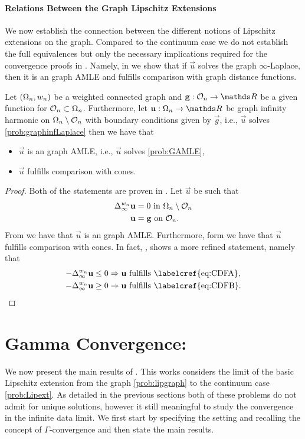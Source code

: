 \paragraph{Relations Between the Graph Lipschitz Extensions} We now establish the connection between the different notions of Lipschitz extensions on the graph. Compared to the continuum case we do not establish the full equivalences but only the necessary implications required for the convergence proofs in \cite{bungert2021uniform}. Namely, in \cite{bungert2021uniform} we show that if $\vec u$ solves the graph $\infty$-Laplace, then it is an graph AMLE and fulfills comparison with graph distance functions. 
%
%
\begin{lemma}{\cite[Th. 3.2, Prop. 3.8]{bungert2021uniform}}{}
Let $(\Omega_n,w_n)$ be a weighted connected graph and $\vec g:\conset_n\to\R$ be a given function for $\mathcal{O}_n\subset\Omega_n$. Furthermore, let $\vec u:\domain_n\to\R$ be graph infinity harmonic on $\Omega_n\setminus\mathcal{O}_n$ with boundary conditions given by $\vec g$, i.e., $\vec u$ solves \cref{prob:graphinfLaplace} then we have that
%
\begin{itemize}
\item $\vec u$ is an graph AMLE, i.e., $\vec u$ solves \cref{prob:GAMLE},
\item $\vec u$ fulfills comparison with cones.
\end{itemize}
\end{lemma}
%
%
\begin{proof}
Both of the statements are proven in \cite{bungert2021uniform}. Let $\vec u$ be such that 
%
\begin{align*}
\Delta^{w_n}_\infty \mathbf{u} &= 0\text{ in }\Omega_n \setminus \mathcal{O}_n\\
\mathbf{u} &= \mathbf{g} \text{ on } \mathcal{O}_n.
\end{align*}
%
From \cite[Prop. 3.8]{bungert2021uniform} we have that $\vec u$ is an graph AMLE. Furthermore, form \cite[Th. 3.2]{bungert2021uniform} we have that $\vec u$ fulfills comparison with cones. In fact, \cite[Th. 3.2]{bungert2021uniform}, shows a more refined statement, namely that
%
\begin{align*}
-\Delta^{w_n}_\infty \vec u &\leq 0 \Rightarrow \vec u \text{ fulfills \labelcref{eq:CDFA}},\\
-\Delta^{w_n}_\infty \vec u &\geq 0 \Rightarrow \vec u \text{ fulfills \labelcref{eq:CDFB}}.
\end{align*}
%
\end{proof}
%
%
%
%
\section{Gamma Convergence: \cite{roith2022continuum}}\label{sec:GConv}
We now present the main results of \cite{roith2022continuum}. This works considers the limit of the basic Lipschitz extension from the graph \cref{prob:lipgraph} to the continuum case \cref{prob:Lipext}. As detailed in the previous sections both of these problems do not admit for unique solutions, however it still meaningful to study the convergence in the infinite data limit. We first start by specifying the setting and recalling the concept of $\Gamma$-convergence and then state the main results.
%
%
